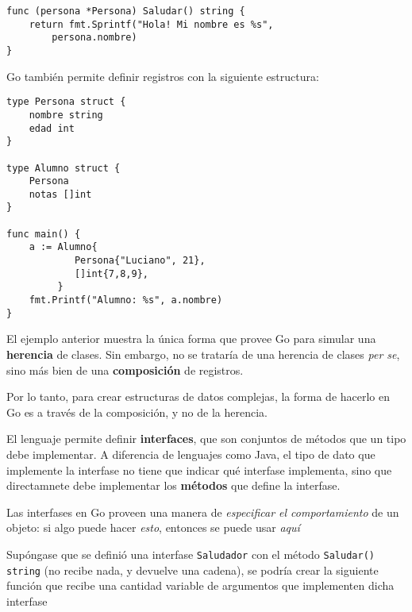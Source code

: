 \vspace*{5mm}
\begin{lstlisting}[title={\centering Método \emph{Saludar} para una persona (nótese que el método recibe un puntero a una persona, Go automáticamente lo dereferencia)}]
func (persona *Persona) Saludar() string {
    return fmt.Sprintf("Hola! Mi nombre es %s",
        persona.nombre)
}
\end{lstlisting}

Go también permite definir registros con la siguiente estructura:

\vspace*{5mm}
\begin{lstlisting}[title=Definición de un registro con registros embebidos (anónimo)]
type Persona struct {
    nombre string
    edad int
}

type Alumno struct {
    Persona
    notas []int
}

func main() {
    a := Alumno{
            Persona{"Luciano", 21},
            []int{7,8,9},
         }
    fmt.Printf("Alumno: %s", a.nombre)
}
\end{lstlisting}

El ejemplo anterior muestra la única forma que provee Go para simular una \textbf{herencia} de clases. Sin embargo, no se trataría de una herencia de clases \emph{per se}, sino más bien de una \textbf{composición} de registros.

Por lo tanto, para crear estructuras de datos complejas, la forma de hacerlo en Go es a través de la composición, y no de la herencia.

El lenguaje permite definir \textbf{interfaces}, que son conjuntos de métodos que un tipo debe implementar. A diferencia de lenguajes como Java, el tipo de dato que implemente la interfase no tiene que indicar qué interfase implementa, sino que directamnete debe implementar los \textbf{métodos} que define la interfase.

\begin{displayquote}
Las interfases en Go proveen una manera de \emph{especificar el comportamiento} de un objeto: si algo puede hacer \emph{esto}, entonces se puede usar \emph{aquí} \autocite{TheWayToGo:Interfaces}   
\end{displayquote}

Supóngase que se definió una interfase \texttt{Saludador} con el método \texttt{Saludar() string} (no recibe nada, y devuelve una cadena), se podría crear la siguiente función que recibe una cantidad variable de argumentos que implementen dicha interfase 

